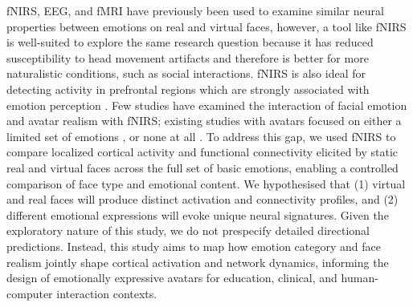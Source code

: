 fNIRS, EEG, and fMRI have previously been used to examine similar neural properties between emotions on real and virtual faces, however, a tool like fNIRS is well-suited to explore the same research question because it has reduced susceptibility to head movement artifacts and therefore is better for more naturalistic conditions, such as social interactions. 
fNIRS is also ideal for detecting activity in prefrontal regions which are strongly associated with emotion perception \citep{westgarth_systematic_2021, bendall_brief_2016}. 
Few studies have examined the interaction of facial emotion and avatar realism with fNIRS; existing studies with avatars focused on either a limited set of emotions \citep{kegel_dynamic_2020}, or none at all \citep{schindler_differential_2017}. 
To address this gap, we used fNIRS to compare localized cortical activity and functional connectivity elicited by static real and virtual faces across the full set of basic emotions, enabling a controlled comparison of face type and emotional content. 
We hypothesised that (1) virtual and real faces will produce distinct activation and connectivity profiles, and (2) different emotional expressions will evoke unique neural signatures. 
Given the exploratory nature of this study, we do not prespecify detailed directional predictions. 
Instead, this study aims to map how emotion category and face realism jointly shape cortical activation and network dynamics, informing the design of emotionally expressive avatars for education, clinical, and human-computer interaction contexts.